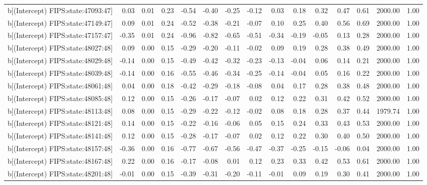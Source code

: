 \begin{table}[ht]
\begin{tabular}{rrrrrrrrrrrrrrr}
  b[(Intercept) FIPS:state:47093:47] & 0.03 & 0.01 & 0.23 & -0.54 & -0.40 & -0.25 & -0.12 & 0.03 & 0.18 & 0.32 & 0.47 & 0.61 & 2000.00 & 1.00 \\ 
  b[(Intercept) FIPS:state:47149:47] & 0.09 & 0.01 & 0.24 & -0.52 & -0.38 & -0.21 & -0.07 & 0.10 & 0.25 & 0.40 & 0.56 & 0.69 & 2000.00 & 1.00 \\ 
  b[(Intercept) FIPS:state:47157:47] & -0.35 & 0.01 & 0.24 & -0.96 & -0.82 & -0.65 & -0.51 & -0.34 & -0.19 & -0.05 & 0.13 & 0.28 & 2000.00 & 1.00 \\ 
  b[(Intercept) FIPS:state:48027:48] & 0.09 & 0.00 & 0.15 & -0.29 & -0.20 & -0.11 & -0.02 & 0.09 & 0.19 & 0.28 & 0.38 & 0.49 & 2000.00 & 1.00 \\ 
  b[(Intercept) FIPS:state:48029:48] & -0.14 & 0.00 & 0.15 & -0.49 & -0.42 & -0.32 & -0.23 & -0.13 & -0.04 & 0.06 & 0.14 & 0.21 & 2000.00 & 1.00 \\ 
  b[(Intercept) FIPS:state:48039:48] & -0.14 & 0.00 & 0.16 & -0.55 & -0.46 & -0.34 & -0.25 & -0.14 & -0.04 & 0.05 & 0.16 & 0.22 & 2000.00 & 1.00 \\ 
  b[(Intercept) FIPS:state:48061:48] & 0.04 & 0.00 & 0.18 & -0.42 & -0.29 & -0.18 & -0.08 & 0.04 & 0.17 & 0.28 & 0.38 & 0.48 & 2000.00 & 1.00 \\ 
  b[(Intercept) FIPS:state:48085:48] & 0.12 & 0.00 & 0.15 & -0.26 & -0.17 & -0.07 & 0.02 & 0.12 & 0.22 & 0.31 & 0.42 & 0.52 & 2000.00 & 1.00 \\ 
  b[(Intercept) FIPS:state:48113:48] & 0.08 & 0.00 & 0.15 & -0.29 & -0.22 & -0.12 & -0.02 & 0.08 & 0.18 & 0.28 & 0.37 & 0.44 & 1979.74 & 1.00 \\ 
  b[(Intercept) FIPS:state:48121:48] & 0.14 & 0.00 & 0.15 & -0.22 & -0.16 & -0.06 & 0.05 & 0.15 & 0.24 & 0.33 & 0.43 & 0.53 & 2000.00 & 1.00 \\ 
  b[(Intercept) FIPS:state:48141:48] & 0.12 & 0.00 & 0.15 & -0.28 & -0.17 & -0.07 & 0.02 & 0.12 & 0.22 & 0.30 & 0.40 & 0.50 & 2000.00 & 1.00 \\ 
  b[(Intercept) FIPS:state:48157:48] & -0.36 & 0.00 & 0.16 & -0.77 & -0.67 & -0.56 & -0.47 & -0.37 & -0.25 & -0.15 & -0.06 & 0.04 & 2000.00 & 1.00 \\ 
  b[(Intercept) FIPS:state:48167:48] & 0.22 & 0.00 & 0.16 & -0.17 & -0.08 & 0.01 & 0.12 & 0.23 & 0.33 & 0.42 & 0.53 & 0.61 & 2000.00 & 1.00 \\ 
  b[(Intercept) FIPS:state:48201:48] & -0.01 & 0.00 & 0.15 & -0.39 & -0.31 & -0.20 & -0.11 & -0.01 & 0.09 & 0.19 & 0.30 & 0.41 & 2000.00 & 1.00 \\ 

\end{tabular}
\end{table}
